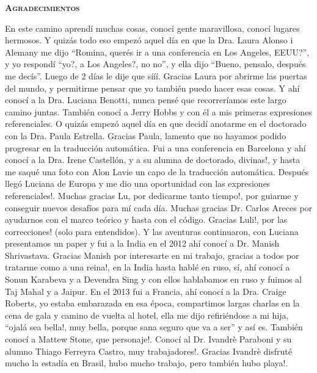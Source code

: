 \thispagestyle{empty}


\begin{center}

{ \vspace*{1cm} }
\huge{\textbf{\textsc{\textmd{Agradecimientos}}}}\\[1cm]

\end{center}

\normalsize{

En este camino aprend\'i muchas cosas, conoc\'i gente maravillosa, conoc\'i lugares hermosos. Y quiz\'as todo eso empez\'o aquel d\'ia en que la Dra. Laura Alonso i Alemany me dijo ``Romina, quer\'es ir a una conferencia en Los Angeles, EEUU?'', y yo respond\'i ``yo?, a Los Angeles?, no no'', y ella dijo ``Bueno, pensalo, despu\'es me dec\'is''. Luego de 2 d\'ias le dije que s\'i\'i\'i. Gracias Laura por abrirme las puertas del mundo, y permitirme pensar que yo tambi\'en puedo hacer esas cosas. Y ah\'i conoc\'i a la Dra. Luciana Benotti, nunca pens\'e que recorrer\'iamos este largo camino juntas. Tambi\'en conoc\'i a Jerry Hobbs y con \'el a mis primeras expresiones referenciales. O quiz\'as empez\'o aquel d\'ia en que decid\'i anotarme en el doctorado con la Dra. Paula Estrella. Gracias Paula, lamento que no hayamos podido progresar en la traducci\'on autom\'atica. Fui a una conferencia en Barcelona y ah\'i conoc\'i a la Dra. Irene Castell\'on, y a su alumna de doctorado, divinas!, y hasta me saqu\'e una foto con Alon Lavie un capo de la traducci\'on autom\'atica. Despu\'es lleg\'o Luciana de Europa y me dio una oportunidad con las expresiones referenciales!. Muchas gracias Lu, por dedicarme tanto tiempo!, por guiarme y conseguir nuevos desaf\'ios para m\'i cada d\'ia. Muchas gracias Dr. Carlos Areces por ayudarnos con el marco te\'orico y hasta con el c\'odigo. Gracias Luli!, por las correcciones! (solo para entendidos). Y las aventuras continuaron, con Luciana presentamos un paper y fui a la India en el 2012 ah\'i conoc\'i a Dr. Manish Shrivastava. Gracias Manish por interesarte en mi trabajo, gracias a todos por tratarme como a una reina!, en la India hasta habl\'e en ruso, s\'i, ah\'i conoc\'i a Sonun Karabeva y a Devendra Sing y con ellos hablabamos en ruso y fuimos al Taj Mahal y a Jaipur. En el 2013 fui a Francia, ah\'i conoc\'i a la Dra. Craige Roberts, yo estaba embarazada en esa \'epoca, compartimos largas charlas en la cena de gala y camino de vuelta al hotel, ella me dijo refiri\'endose a mi hija, ``ojal\'a sea bella!, muy bella, porque sana seguro que va a ser'' y as\'i es. Tambi\'en conoc\'i a Mattew Stone, que personaje!. Conoc\'i al Dr. Ivandr\`e Paraboni y su alumno Thiago Ferreyra Castro, muy trabajadores!. Gracias Ivandr\`e disfrut\'e mucho la estad\'ia en Brasil, hubo mucho trabajo, pero tambi\'en hubo playa!.

}
